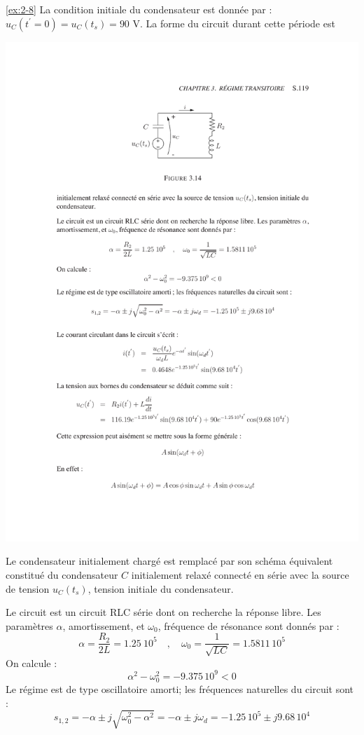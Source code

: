 \begin{solexercise}{\ref{ex:2-8}}
La condition initiale du condensateur est donn\'ee par :
$u_C(t^{'}=0)=u_C(t_s)=90$ V.
La forme du circuit durant cette p\'eriode est 
\begin{center}
	\includegraphics[width=\linewidth]{sol_exercices/ex3-8}
\end{center}
Le condensateur initialement charg\'e est remplac\'e
par son sch\'ema \'equivalent constitu\'e du condensateur $C$ initialement
relax\'e connect\'e en s\'erie avec la source de tension $u_C(t_s)$, tension
initiale du condensateur.


Le circuit est un circuit RLC s\'erie dont on recherche la r\'eponse
libre. Les param\`etres $\alpha$, amortissement, et $\omega_0$, fr\'equence de
r\'esonance sont donn\'es par :
\[\alpha=\frac{R_2}{2L}=1.25\ 10^5\quad , \quad
\omega_0=\frac{1}{\sqrt{LC}}=1.5811\, 10^5\]
On calcule :
\[\alpha^2-\omega_0^2=-9.375\, 10^9 <0\]
Le r\'egime est de type oscillatoire amorti; les fr\'equences naturelles
du circuit sont :
\[s_{1,2}=-\alpha \pm j\sqrt{\omega_0^2-\alpha^2}=-\alpha \pm j\omega_d=
-1.25\, 10^5 \pm
j9.68\, 10^4\]


\end{solexercise}
